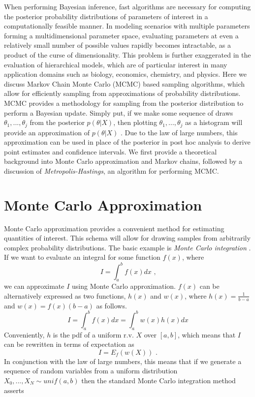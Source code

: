 \documentclass[
  12pt,
  oneside]{book}
\theoremstyle{definition}
\theoremstyle{definition}
\theoremstyle{definition}
\theoremstyle{remark}
\begin{document}
When performing Bayesian inference, fast algorithms are necessary for computing the posterior probability distributions of parameters of interest in a computationally feasible manner.
In modeling scenarios with multiple parameters forming a multidimensional parameter space, evaluating parameters at even a relatively small number of possible values rapidly becomes intractable, as a product of the curse of dimensionality.
This problem is further exaggerated in the evaluation of hierarchical models, which are of particular interest in many application domains such as biology, economics, chemistry, and physics.
Here we discuss Markov Chain Monte Carlo (MCMC) based sampling algorithms, which allow for efficiently sampling from approximations of probability distributions.
MCMC provides a methodology for sampling from the posterior distribution to perform a Bayesian update.
Simply put, if we make some sequence of draws \(\theta_1,...,\theta_j\) from the posterior \(p(\theta|X)\), then plotting \(\theta_1,...,\theta_j\) as a histogram will provide an approximation of \(p(\theta|X)\) \citep[  11.4]{Wasserman2004}.
Due to the law of large numbers, this approximation can be used in place of the posterior in post hoc analysis to derive point estimates and confidence intervals.
We first provide a theoretical background into Monte Carlo approximation and Markov chains, followed by a discussion of \emph{Metropolis-Hastings}, an algorithm for performing MCMC.

\hypertarget{monte-carlo-approximation}{%
\section{Monte Carlo Approximation}\label{monte-carlo-approximation}}

Monte Carlo approximation provides a convenient method for estimating quantities of interest.
This schema will allow for drawing samples from arbitrarily complex probability distributions.
The basic example is \emph{Monte Carlo integration} \citep[  24.2]{Wasserman2004}.
If we want to evaluate an integral for some function \(f(x)\), where
\[I=\int_{a}^{b}f(x)dx \textrm{ ,}\]
we can approximate \(I\) using Monte Carlo approximation. \(f(x)\) can be alternatively expressed as two functions, \(h(x)\) and \(w(x)\), where \(h(x)=\frac{1}{b-a}\) and \(w(x)=f(x)(b-a)\) as follows.
\[I=\int_{a}^{b}f(x)dx=\int_{a}^{b}w(x)h(x)dx\]
Conveniently, \(h\) is the pdf of a uniform r.v. \(X\) over \([a,b]\), which means that \(I\) can be rewritten in terms of expectation as
\[I=E_{f}(w(X)) \textrm{ .}\]
In conjunction with the law of large numbers, this means that if we generate a sequence of random variables from a uniform distribution \(X_{0},...,X_{N}\sim unif(a,b)\) then the standard Monte Carlo integration method asserts
\end{document}
